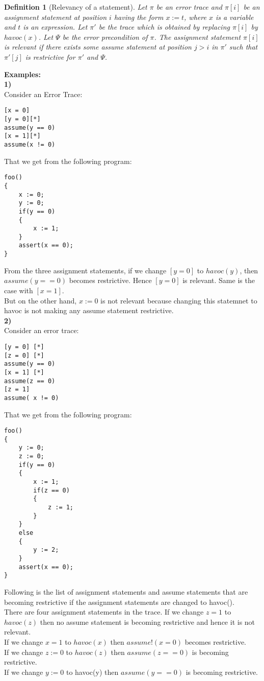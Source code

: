 \documentclass{article}
\newtheorem{mydef}{Definition}
\begin{document}
\begin{mydef}[Relevancy of a statement]
Let $\pi$ be an error trace and $\pi[i]$ be an assignment statement at position $i$ having the form $x:=t$, where $x$ is a variable and $t$ is an expression. Let $\pi'$ be the trace which is obtained by replacing $\pi[i]$ by  $havoc(x)$. Let $\Psi$ be the error precondition of $\pi$. The assignment statement $\pi[i]$ is \emph{relevant} if there exists some assume statement at position $j > i$ in $\pi'$ such that $\pi'[j]$ is restrictive for $\pi'$ and $\Psi$. 
\end{mydef}
\textbf{Examples:}\\
\textbf{1)}\\
Consider an Error Trace:
\begin{lstlisting}
[x = 0]
[y = 0][*]
assume(y == 0)
[x = 1][*]
assume(x != 0)
\end{lstlisting}
That we get from the following program:
\begin{lstlisting}
foo()
{
	x := 0;
	y := 0;
	if(y == 0)
	{
		x := 1;
	}
	assert(x == 0);
}
\end{lstlisting}
From the three assignment statements, if we change $[y = 0]$ to $havoc(y)$, then $assume(y == 0)$ becomes restrictive. Hence $[y = 0]$ is relevant. Same is the case with $[x = 1]$.\\
But on the other hand, $x := 0$ is not relevant because changing this statemnet to havoc is not making any assume statement restrictive.\\
\textbf{2)}\\
Consider an error trace:
\begin{lstlisting}
[y = 0] [*]
[z = 0] [*]
assume(y == 0)
[x = 1] [*]
assume(z == 0)
[z = 1]
assume( x != 0)
\end{lstlisting}
That we get from the following program:
\begin{lstlisting}
foo()
{
	y := 0;
	z := 0;
	if(y == 0)
	{
		x := 1;
		if(z == 0)
		{
			z := 1;
		}
	}
	else
	{
		y := 2;
	}
	assert(x == 0);
}
\end{lstlisting}
Following is the list of assignment statements and assume statements that are becoming restrictive if the assignment statements are changed to havoc().\\
There are four assignment statements in the trace. If we change $z=1$ to $havoc(z)$ then no assume statement is becoming restrictive and hence it is not relevant. \\
If we change $x=1$ to $havoc(x)$ then $assume !(x=0)$ becomes restrictive. \\
If we change $z := 0$ to $havoc(z)$ then $assume(z==0)$ is becoming restrictive.\\
If we change $y:=0$ to havoc(y) then $assume(y==0)$ is becoming restrictive.
\end{document}
